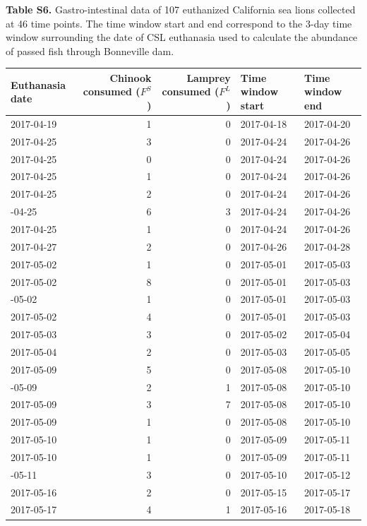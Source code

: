 \documentclass[
]{article}
\begin{document}
\newpage

\textbf{Table S6.} Gastro-intestinal data of 107 euthanized California
sea lions collected at 46 time points. The time window start and end
correspond to the 3-day time window surrounding the date of CSL
euthanasia used to calculate the abundance of passed fish through
Bonneville dam.

\begin{longtable}{lrrll}
\toprule
Euthanasia date & Chinook consumed ($F^S$) & Lamprey consumed ($F^L$) & Time window start & Time window end\\
\midrule
2017-04-19 & 1 & 0 & 2017-04-18 & 2017-04-20\\
2017-04-25 & 3 & 0 & 2017-04-24 & 2017-04-26\\
2017-04-25 & 0 & 0 & 2017-04-24 & 2017-04-26\\
2017-04-25 & 1 & 0 & 2017-04-24 & 2017-04-26\\
2017-04-25 & 2 & 0 & 2017-04-24 & 2017-04-26\\
\addlinespace
2017-04-25 & 6 & 3 & 2017-04-24 & 2017-04-26\\
2017-04-25 & 1 & 0 & 2017-04-24 & 2017-04-26\\
2017-04-27 & 2 & 0 & 2017-04-26 & 2017-04-28\\
2017-05-02 & 1 & 0 & 2017-05-01 & 2017-05-03\\
2017-05-02 & 8 & 0 & 2017-05-01 & 2017-05-03\\
\addlinespace
2017-05-02 & 1 & 0 & 2017-05-01 & 2017-05-03\\
2017-05-02 & 4 & 0 & 2017-05-01 & 2017-05-03\\
2017-05-03 & 3 & 0 & 2017-05-02 & 2017-05-04\\
2017-05-04 & 2 & 0 & 2017-05-03 & 2017-05-05\\
2017-05-09 & 5 & 0 & 2017-05-08 & 2017-05-10\\
\addlinespace
2017-05-09 & 2 & 1 & 2017-05-08 & 2017-05-10\\
2017-05-09 & 3 & 7 & 2017-05-08 & 2017-05-10\\
2017-05-09 & 1 & 0 & 2017-05-08 & 2017-05-10\\
2017-05-10 & 1 & 0 & 2017-05-09 & 2017-05-11\\
2017-05-10 & 1 & 0 & 2017-05-09 & 2017-05-11\\
\addlinespace
2017-05-11 & 3 & 0 & 2017-05-10 & 2017-05-12\\
2017-05-16 & 2 & 0 & 2017-05-15 & 2017-05-17\\
2017-05-17 & 4 & 1 & 2017-05-16 & 2017-05-18\\

\end{longtable}
\end{document}
